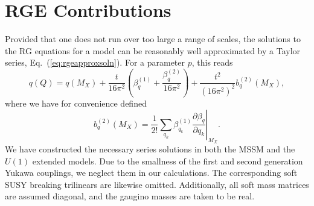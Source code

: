 \documentclass[preprint,amsmath,amssymb,aps,superscriptaddress,prd,
showpacs,floatfix,nofootinbib]{revtex4-1}
\begin{document}
\section{\label{app:rges}RGE Contributions}

Provided that one does not run over too large a range of scales, the
solutions to the RG equations for a model can be reasonably well
approximated by a Taylor series, Eq.~(\ref{eq:rgeapproxsoln}).  For a
parameter $p$, this reads
\begin{equation*}
q(Q) = q(M_X) + \frac{t}{16\pi^2} \left ( \beta_q^{(1)} +
\frac{\beta_q^{(2)}}{16\pi^2} \right ) + \frac{t^2}{(16\pi^2)^2}
b_q^{(2)}(M_X) ,
\end{equation*}
where we have for convenience defined
\begin{equation*}
b_q^{(2)}(M_X) = \frac{1}{2!} \left . \sum_{q_k} \beta_{q_k}^{(1)}
\frac{\partial \beta_q}{\partial q_k} \right |_{M_X} .
\end{equation*}
We have constructed the necessary series solutions in both the MSSM
and the $U(1)$ extended models.  Due to the smallness of the first and
second generation Yukawa couplings, we neglect them in our
calculations.  The corresponding soft SUSY breaking trilinears are
likewise omitted.  Additionally, all soft mass matrices are assumed
diagonal, and the gaugino masses are taken to be real.
\end{document}
